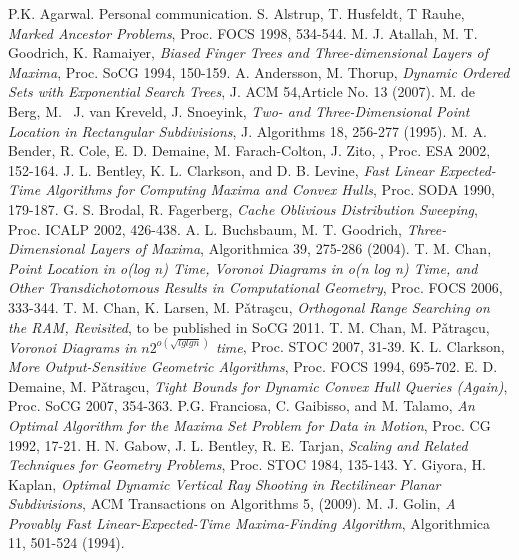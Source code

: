\documentclass[10pt]{llncs}
\begin{document}
\begin{thebibliography}{99}
 P.K. Agarwal. Personal communication.
S. Alstrup, T. Husfeldt, T Rauhe, {\em Marked Ancestor Problems},
Proc.  FOCS 1998, 534-544.
M. J. Atallah, M. T. Goodrich,  K. Ramaiyer, {\em Biased Finger Trees and 
Three-dimensional Layers of Maxima}, Proc. SoCG 1994, 150-159.
A. Andersson, M. Thorup, {\em  Dynamic Ordered Sets with Exponential Search Trees}, J. ACM 54,Article No. 13 (2007).
M. de Berg, M.~ J. van Kreveld, J. Snoeyink,  {\em Two- and Three-Dimensional Point Location in Rectangular Subdivisions}, J. Algorithms 18,  256-277 (1995).
M. A. Bender, R. Cole, E. D. Demaine, M. Farach-Colton, J. Zito,
,
\newblock Proc.   ESA 2002, 152-164.
J. L. Bentley, K. L. Clarkson, and D. B. Levine,
{\em  Fast Linear Expected-Time Algorithms for Computing Maxima and
Convex Hulls}, Proc. SODA 1990, 179-187.
G. S. Brodal, R. Fagerberg, {\em Cache Oblivious Distribution Sweeping},
Proc.  ICALP 2002, 426-438.
A. L. Buchsbaum, M. T. Goodrich, {\em Three-Dimensional Layers of Maxima},
 Algorithmica 39, 275-286 (2004).
T. M. Chan, {\em Point Location in o(log n) Time, Voronoi Diagrams in o(n log n) Time, and Other Transdichotomous Results in Computational Geometry},
Proc. FOCS 2006,  333-344.
T. M. Chan, K. Larsen, M. P\v{a}tra\c{s}cu,
{\em Orthogonal Range Searching on the RAM, Revisited},
to be published in SoCG 2011. 
T. M. Chan, M. P\v{a}tra\c{s}cu, {\em Voronoi Diagrams in $n2^{o(\sqrt{lg lg n})}$ 
time}, Proc.  STOC 2007, 31-39.
K. L. Clarkson, {\em More Output-Sensitive Geometric Algorithms}, 
 Proc. FOCS 1994, 695-702.
E. D. Demaine, M. P\v{a}tra\c{s}cu, {\em Tight Bounds for Dynamic Convex Hull Queries (Again)}, Proc. SoCG 2007, 354-363.
P.G. Franciosa, C. Gaibisso, and M. Talamo, {\em  An Optimal Algorithm for the Maxima Set Problem for Data in Motion},  Proc. CG 1992, 17-21.
H. N. Gabow, J. L. Bentley, R. E. Tarjan, {\em Scaling and Related Techniques for Geometry Problems}, Proc.  STOC 1984, 135-143.
 Y. Giyora, H. Kaplan,
{\em  Optimal Dynamic Vertical Ray Shooting in Rectilinear Planar 
Subdivisions},  ACM Transactions on Algorithms 5, (2009).
M. J. Golin,
{\em  A Provably Fast Linear-Expected-Time Maxima-Finding Algorithm},
 Algorithmica 11, 501-524 (1994).

\end{thebibliography}
\end{document}
